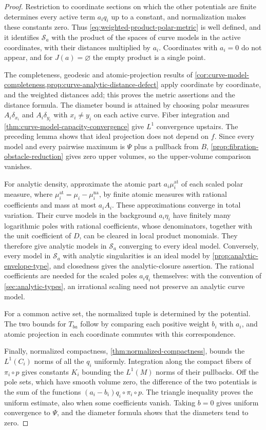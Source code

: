 \begin{proof}
Restriction to coordinate sections on which the other potentials are finite determines every active term $a_iq_i$ up to a constant, and normalization makes these constants zero. Thus \eqref{eq:weighted-product-polar-metric} is well defined, and it identifies $\mathcal S_a$ with the product of the spaces of curve models in the active coordinates, with their distances multiplied by $a_i$. Coordinates with $a_i=0$ do not appear, and for $J(a)=\varnothing$ the empty product is a single point.

The completeness, geodesic and atomic-projection results of \cref{cor:curve-model-completeness,prop:curve-analytic-distance-defect} apply coordinate by coordinate, and the weighted distances add; this proves the metric assertions and the distance formula. The diameter bound is attained by choosing polar measures $A_i\delta_{x_i}$ and $A_i\delta_{y_i}$ with $x_i\ne y_i$ on each active curve. Fiber integration and \cref{thm:curve-model-capacity-convergence} give $L^1$ convergence upstairs. The preceding lemma shows that ideal projection does not depend on $f$. Since every model and every pairwise maximum is $\Psi$ plus a pullback from $B$, \cref{prop:fibration-obstacle-reduction} gives zero upper volumes, so the upper-volume comparison vanishes.

For analytic density, approximate the atomic part $a_i\mu_i^{\mathrm{at}}$ of each scaled polar measure, where $\mu_i^{\mathrm{at}}=\mu_i-\mu_i^{\mathrm{na}}$, by finite atomic measures with rational coefficients and mass at most $a_iA_i$. These approximations converge in total variation. Their curve models in the background $a_i\eta_i$ have finitely many logarithmic poles with rational coefficients, whose denominators, together with the unit coefficient of $D$, can be cleared in local product monomials. They therefore give analytic models in $\mathcal S_a$ converging to every ideal model. Conversely, every model in $\mathcal S_a$ with analytic singularities is an ideal model by \cref{prop:analytic-envelope-type}, and closedness gives the analytic-closure assertion. The rational coefficients are needed for the scaled poles $a_iq_i$ themselves: with the convention of \cref{sec:analytic-types}, an irrational scaling need not preserve an analytic curve model.

For a common active set, the normalized tuple is determined by the potential. The two bounds for $T_{ba}$ follow by comparing each positive weight $b_i$ with $a_i$, and atomic projection in each coordinate commutes with this correspondence.

Finally, normalized compactness, \cref{thm:normalized-compactness}, bounds the $L^1(C_i)$ norms of all the $q_i$ uniformly. Integration along the compact fibers of $\pi_i\circ p$ gives constants $K_i$ bounding the $L^1(M)$ norms of their pullbacks. Off the pole sets, which have smooth volume zero, the difference of the two potentials is the sum of the functions $(a_i-b_i)q_i\circ\pi_i\circ p$. The triangle inequality proves the uniform estimate, also when some coefficients vanish. Taking $b=0$ gives uniform convergence to $\Psi$, and the diameter formula shows that the diameters tend to zero.
\end{proof}

